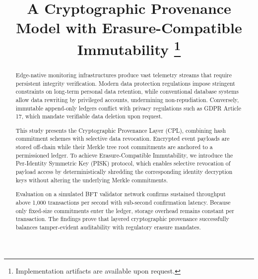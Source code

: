 \documentclass[conference]{IEEEtran}
\begin{document}
\title{A Cryptographic Provenance Model with Erasure-Compatible Immutability
\thanks{Implementation artifacts are available upon request.}
}

\author{
}

\maketitle

\begin{abstract}
Edge-native monitoring infrastructures produce vast telemetry streams that require persistent integrity verification. Modern data protection regulations impose stringent constraints on long-term personal data retention, while conventional database systems allow data rewriting by privileged accounts, undermining non-repudiation. Conversely, immutable append-only ledgers conflict with privacy regulations such as GDPR Article 17, which mandate verifiable data deletion upon request.

This study presents the Cryptographic Provenance Layer (CPL), combining hash commitment schemes with selective data revocation. Encrypted event payloads are stored off-chain while their Merkle tree root commitments are anchored to a permissioned ledger. To achieve Erasure-Compatible Immutability, we introduce the Per-Identity Symmetric Key (PISK) protocol, which enables selective revocation of payload access by deterministically shredding the corresponding identity decryption keys without altering the underlying Merkle commitments.

Evaluation on a simulated BFT validator network confirms sustained throughput above 1,000 transactions per second with sub-second confirmation latency. Because only fixed-size commitments enter the ledger, storage overhead remains constant per transaction. The findings prove that layered cryptographic provenance successfully balances tamper-evident auditability with regulatory erasure mandates.
\end{abstract}
\end{document}
